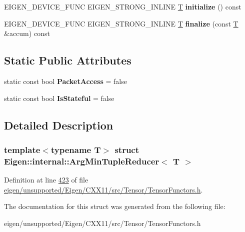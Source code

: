 \begin{DoxyCompactItemize}
\item 
\mbox{\label{struct_eigen_1_1internal_1_1_arg_min_tuple_reducer_a3861e16cd31e4f06c3d726dae9956fd9}} 
E\+I\+G\+E\+N\+\_\+\+D\+E\+V\+I\+C\+E\+\_\+\+F\+U\+NC E\+I\+G\+E\+N\+\_\+\+S\+T\+R\+O\+N\+G\+\_\+\+I\+N\+L\+I\+NE \hyperlink{group___sparse_core___module}{T} {\bfseries initialize} () const
\item 
\mbox{\label{struct_eigen_1_1internal_1_1_arg_min_tuple_reducer_aa825ab40b1079197432a31f70acce2dd}} 
E\+I\+G\+E\+N\+\_\+\+D\+E\+V\+I\+C\+E\+\_\+\+F\+U\+NC E\+I\+G\+E\+N\+\_\+\+S\+T\+R\+O\+N\+G\+\_\+\+I\+N\+L\+I\+NE \hyperlink{group___sparse_core___module}{T} {\bfseries finalize} (const \hyperlink{group___sparse_core___module}{T} \&accum) const
\end{DoxyCompactItemize}
\subsection*{Static Public Attributes}
\begin{DoxyCompactItemize}
\item 
\mbox{\label{struct_eigen_1_1internal_1_1_arg_min_tuple_reducer_a1f004be497dc31c84165ac62de5289aa}} 
static const bool {\bfseries Packet\+Access} = false
\item 
\mbox{\label{struct_eigen_1_1internal_1_1_arg_min_tuple_reducer_adf0e6d0d67fecc4c41a8a5809eae3b9f}} 
static const bool {\bfseries Is\+Stateful} = false
\end{DoxyCompactItemize}


\subsection{Detailed Description}
\subsubsection*{template$<$typename T$>$\newline
struct Eigen\+::internal\+::\+Arg\+Min\+Tuple\+Reducer$<$ T $>$}



Definition at line \hyperlink{eigen_2unsupported_2_eigen_2_c_x_x11_2src_2_tensor_2_tensor_functors_8h_source_l00423}{423} of file \hyperlink{eigen_2unsupported_2_eigen_2_c_x_x11_2src_2_tensor_2_tensor_functors_8h_source}{eigen/unsupported/\+Eigen/\+C\+X\+X11/src/\+Tensor/\+Tensor\+Functors.\+h}.



The documentation for this struct was generated from the following file\+:\begin{DoxyCompactItemize}
\item 
eigen/unsupported/\+Eigen/\+C\+X\+X11/src/\+Tensor/\+Tensor\+Functors.\+h\end{DoxyCompactItemize}
